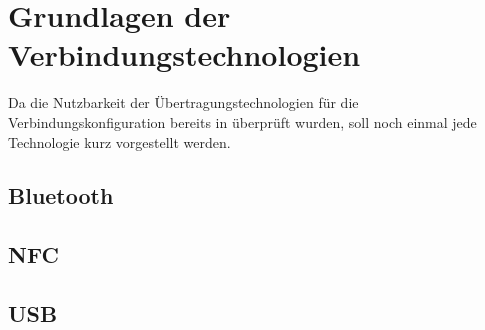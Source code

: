 \section{Grundlagen der Verbindungstechnologien}
	Da die Nutzbarkeit der Übertragungstechnologien für die Verbindungskonfiguration bereits in \cite{aiProject} überprüft wurden, soll noch einmal jede Technologie kurz vorgestellt werden.
	\subsection{Bluetooth}
	
	\subsection{NFC}
	
	\subsection{USB}
